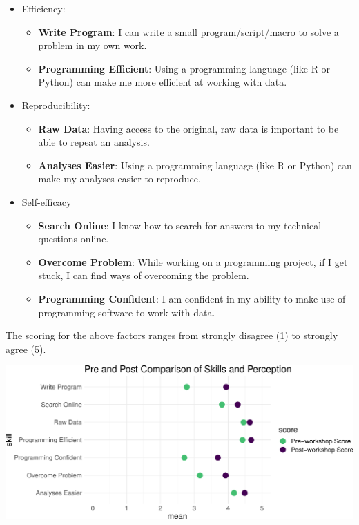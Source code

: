 \documentclass[]{article}
\makeatletter
\def\maxwidth{\ifdim\Gin@nat@width>\linewidth\linewidth\else\Gin@nat@width\fi}
\providecommand{\tightlist}{%
  \setlength{\itemsep}{0pt}\setlength{\parskip}{0pt}}
\makeatother
\begin{document}
\begin{itemize}
\tightlist
\item
  Efficiency:

  \begin{itemize}
  \tightlist
  \item
    \textbf{Write Program}: I can write a small program/script/macro to
    solve a problem in my own work.
  \item
    \textbf{Programming Efficient}: Using a programming language (like R
    or Python) can make me more efficient at working with data.
  \end{itemize}
\item
  Reproducibility:

  \begin{itemize}
  \tightlist
  \item
    \textbf{Raw Data}: Having access to the original, raw data is
    important to be able to repeat an analysis.
  \item
    \textbf{Analyses Easier}: Using a programming language (like R or
    Python) can make my analyses easier to reproduce.
  \end{itemize}
\item
  Self-efficacy

  \begin{itemize}
  \tightlist
  \item
    \textbf{Search Online}: I know how to search for answers to my
    technical questions online.
  \item
    \textbf{Overcome Problem}: While working on a programming project,
    if I get stuck, I can find ways of overcoming the problem.
  \item
    \textbf{Programming Confident}: I am confident in my ability to make
    use of programming software to work with data.
  \end{itemize}
\end{itemize}

The scoring for the above factors ranges from strongly disagree (1) to
strongly agree (5).

\includegraphics[width=\maxwidth]{../figures/dc-paired-data-mean-1}
\end{document}
